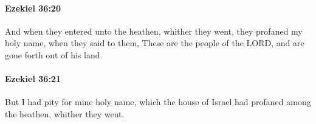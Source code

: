 		\paragraph{Ezekiel 36:20} %
			\label{EZEKIEL-36-20}

			And when they entered unto the heathen, whither they went, they profaned my holy name, when they said to them, These are the people of the LORD, and are gone forth out of his land.


		\paragraph{Ezekiel 36:21} %
			\label{EZEKIEL-36-21}

			But I had pity for mine holy name, which the house of Israel had profaned among the heathen, whither they went.


